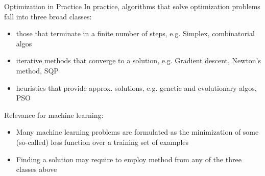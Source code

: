 \begin{frame}{Optimization in Practice}
    In practice, algorithms that solve optimization problems fall into three broad classes:
    \begin{itemize}
        \item those that terminate in a finite number of steps, e.g. Simplex, combinatorial algos
        \item iterative methods that converge to a solution, e.g. Gradient descent, Newton's method, SQP
        \item heuristics that provide approx. solutions, e.g. genetic and evolutionary algos, PSO
    \end{itemize}

    Relevance for machine learning:
    \begin{itemize}
        \item Many machine learning problems are formulated as the
              minimization of some (so-called) loss function over a training set of examples
        \item Finding a solution may require to employ method from any of the three classes above
    \end{itemize}
\end{frame}

